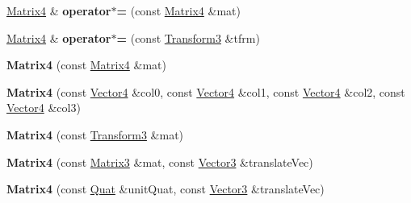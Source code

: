 \begin{DoxyCompactItemize}
\item 
\hypertarget{classVectormath_1_1Aos_1_1Matrix4_af05c570331bd864517724d59adef75b4}{\hyperlink{classVectormath_1_1Aos_1_1Matrix4}{Matrix4} \& {\bfseries operator$\ast$=} (const \hyperlink{classVectormath_1_1Aos_1_1Matrix4}{Matrix4} \&mat)}\label{classVectormath_1_1Aos_1_1Matrix4_af05c570331bd864517724d59adef75b4}

\item 
\hypertarget{classVectormath_1_1Aos_1_1Matrix4_a053ede80a942459e3580bf23d6a1c0cc}{\hyperlink{classVectormath_1_1Aos_1_1Matrix4}{Matrix4} \& {\bfseries operator$\ast$=} (const \hyperlink{classVectormath_1_1Aos_1_1Transform3}{Transform3} \&tfrm)}\label{classVectormath_1_1Aos_1_1Matrix4_a053ede80a942459e3580bf23d6a1c0cc}

\item 
\hypertarget{classVectormath_1_1Aos_1_1Matrix4_a025fe2cfa1581016444f2306c1112344}{{\bfseries Matrix4} (const \hyperlink{classVectormath_1_1Aos_1_1Matrix4}{Matrix4} \&mat)}\label{classVectormath_1_1Aos_1_1Matrix4_a025fe2cfa1581016444f2306c1112344}

\item 
\hypertarget{classVectormath_1_1Aos_1_1Matrix4_a681dec8c41b89e5f5bff0f58508cb317}{{\bfseries Matrix4} (const \hyperlink{classVectormath_1_1Aos_1_1Vector4}{Vector4} \&col0, const \hyperlink{classVectormath_1_1Aos_1_1Vector4}{Vector4} \&col1, const \hyperlink{classVectormath_1_1Aos_1_1Vector4}{Vector4} \&col2, const \hyperlink{classVectormath_1_1Aos_1_1Vector4}{Vector4} \&col3)}\label{classVectormath_1_1Aos_1_1Matrix4_a681dec8c41b89e5f5bff0f58508cb317}

\item 
\hypertarget{classVectormath_1_1Aos_1_1Matrix4_a3fa883e2169015e3de19961e2c1256a1}{{\bfseries Matrix4} (const \hyperlink{classVectormath_1_1Aos_1_1Transform3}{Transform3} \&mat)}\label{classVectormath_1_1Aos_1_1Matrix4_a3fa883e2169015e3de19961e2c1256a1}

\item 
\hypertarget{classVectormath_1_1Aos_1_1Matrix4_a02d81c98c918ca0a4e10f23811528e85}{{\bfseries Matrix4} (const \hyperlink{classVectormath_1_1Aos_1_1Matrix3}{Matrix3} \&mat, const \hyperlink{classVectormath_1_1Aos_1_1Vector3}{Vector3} \&translate\-Vec)}\label{classVectormath_1_1Aos_1_1Matrix4_a02d81c98c918ca0a4e10f23811528e85}

\item 
\hypertarget{classVectormath_1_1Aos_1_1Matrix4_a658f2058d620e1cb1cce86505f43d231}{{\bfseries Matrix4} (const \hyperlink{classVectormath_1_1Aos_1_1Quat}{Quat} \&unit\-Quat, const \hyperlink{classVectormath_1_1Aos_1_1Vector3}{Vector3} \&translate\-Vec)}\label{classVectormath_1_1Aos_1_1Matrix4_a658f2058d620e1cb1cce86505f43d231}


\end{DoxyCompactItemize}
